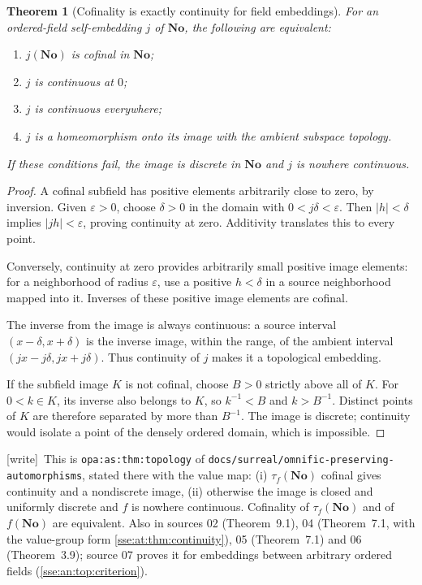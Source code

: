 \documentclass[11pt,a4paper]{article}
\numberwithin{equation}{section}
\theoremstyle{plain}
\newtheorem{theorem}{Theorem}[section]
\theoremstyle{definition}
\theoremstyle{remark}
\newcommand{\No}{\mathbf{No}}
\newcommand{\lbl}[1]{\nolinkurl{#1}}%
\newcommand{\fn}[1]{\nolinkurl{#1}}%
\newcommand{\wtag}{\textup{\textsf{[write]}}}%
\newenvironment{wnote}{\par\smallskip\noindent\wtag\ }{\par\smallskip}
\begin{document}
\begin{theorem}[Cofinality is exactly continuity for field embeddings]
\label{sse:thm:topdichotomy}
For an ordered-field self-embedding $j$ of $\No$, the following are
equivalent:
\begin{enumerate}[label=(\roman*)]
\item $j(\No)$ is cofinal in $\No$;
\item $j$ is continuous at $0$;
\item $j$ is continuous everywhere;
\item $j$ is a homeomorphism onto its image with the ambient subspace topology.
\end{enumerate}
If these conditions fail, the image is discrete in $\No$ and $j$ is
nowhere continuous.
\end{theorem}
\begin{proof}
A cofinal subfield has positive elements arbitrarily close to zero, by
inversion. Given $\varepsilon>0$, choose $\delta>0$ in the domain with
$0<j\delta<\varepsilon$. Then $|h|<\delta$ implies
$|jh|<\varepsilon$, proving continuity at zero. Additivity translates this
to every point.

Conversely, continuity at zero provides arbitrarily small positive image
elements: for a neighborhood of radius $\varepsilon$, use a positive
$h<\delta$ in a source neighborhood mapped into it. Inverses of these
positive image elements are cofinal.

The inverse from the image is always continuous: a source interval
$(x-\delta,x+\delta)$ is the inverse image, within the range, of the ambient
interval $(jx-j\delta,jx+j\delta)$. Thus continuity of $j$ makes it a
topological embedding.

If the subfield image $K$ is not cofinal, choose $B>0$ strictly above all
of $K$. For $0<k\in K$, its inverse also belongs to $K$, so
$k^{-1}<B$ and $k>B^{-1}$. Distinct points of $K$ are therefore separated
by more than $B^{-1}$. The image is discrete; continuity would isolate a
point of the densely ordered domain, which is impossible.
\end{proof}
\begin{wnote}This is \lbl{opa:as:thm:topology} of \fn{docs/surreal/omnific-preserving-automorphisms}, stated there with the value map: (i) $\tau_f(\No)$ cofinal gives continuity and a nondiscrete image, (ii) otherwise the image is closed and uniformly discrete and $f$ is nowhere continuous. Cofinality of $\tau_f(\No)$ and of $f(\No)$ are equivalent. Also in sources 02 (Theorem~9.1), 04 (Theorem~7.1, with the value-group form \cref{sse:at:thm:continuity}), 05 (Theorem~7.1) and 06 (Theorem~3.9); source 07 proves it for embeddings between arbitrary ordered fields (\cref{sse:an:top:criterion}).\end{wnote}
\end{document}
